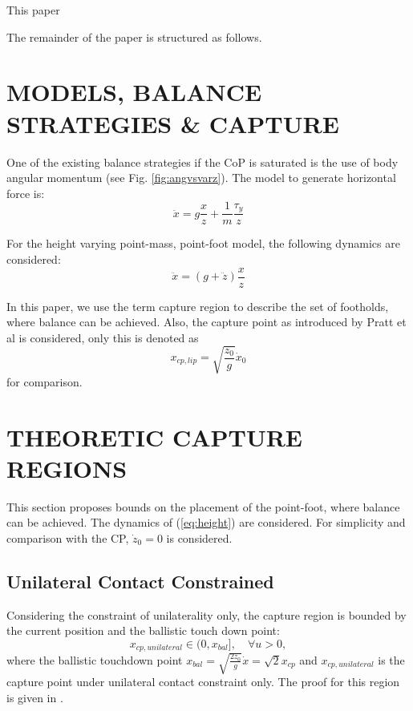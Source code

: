 \documentclass[letterpaper, 10 pt, conference]{ieeeconf}  %
\begin{document}
This paper

The remainder of the paper is structured as follows.

\section{MODELS, BALANCE STRATEGIES \& CAPTURE}
One of the existing balance strategies if the CoP is saturated is the use of body angular momentum (see Fig. \ref{fig:angvsvarz}). The model to generate horizontal force is:
\begin{equation}
	\ddot{x} = g\frac{x}{z} + \frac{1}{m}\frac{\tau_y}{z}
\end{equation}

For the height varying point-mass, point-foot model, the following dynamics are considered:
\begin{equation}
	\ddot{x} = (g+\ddot{z})\frac{x}{z} 
	\label{eq:height}
\end{equation}

In this paper, we use the term capture region \cite{pratt2006capture} to describe the set of footholds, where balance can be achieved. Also, the capture point as introduced by Pratt et al is considered, only this is denoted as
\begin{equation}
	x_{cp,lip} = \sqrt{\frac{z_0}{g}}\dot{x}_0
\end{equation}
for comparison.
\section{THEORETIC CAPTURE REGIONS}
This section proposes bounds on the placement of the point-foot, where balance can be achieved. The dynamics of (\ref{eq:height}) are considered. For simplicity and comparison with the CP, $\dot{z}_0=0$ is considered.
\subsection{Unilateral Contact Constrained}
 Considering the constraint of unilaterality only, the capture region is bounded by the current position and the ballistic touch down point:
\begin{equation}
	x_{cp,unilateral} \in (0, x_{bal}], \quad \forall u>0, 
	\label{eq:xcpuni}
\end{equation}
where the ballistic touchdown point $x_{bal}=\sqrt{\frac{2z_0}{g}}\dot{x}=\sqrt{2}x_{cp}$ and $x_{cp,unilateral}$ is the capture point under unilateral contact constraint only. The proof for this region is given in \cite{koolen2016balance}.
\end{document}

